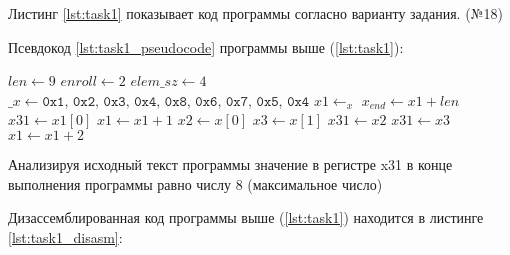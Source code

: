 Листинг \ref{lst:task1} показывает код программы согласно варианту задания. (№18)

\clearpage

Псевдокод \ref{lst:task1_pseudocode} программы выше (\ref{lst:task1}):
\begin{algorithmic}\label{lst:task1_pseudocode}
\State $len \gets 9$ 
\State $enroll \gets 2$ 
\State $elem\_sz \gets 4$ 
\State $\_x \gets \texttt{0x1, 0x2, 0x3, 0x4, 0x8, 0x6, 0x7, 0x5, 0x4}$
\State $x1 \gets _x$
\State $x_{end} \gets x1 + len$
\State $x31 \gets x1[0]$
\State $x1 \gets x1 + 1$
    \State $x2 \gets x[0]$
    \State $x3 \gets x[1]$
    \State $x31 \gets x2$
    \EndIf
    \State $x31 \gets x3$
    \EndIf
    \State $x1 \gets x1 + 2$
\EndWhile
\end{algorithmic}

Анализируя исходный текст программы значение в регистре x31 в конце выполнения программы равно числу 8 (максимальное число)

Дизассемблированная код  программы выше (\ref{lst:task1}) находится в листинге \ref{lst:task1_disasm}:

